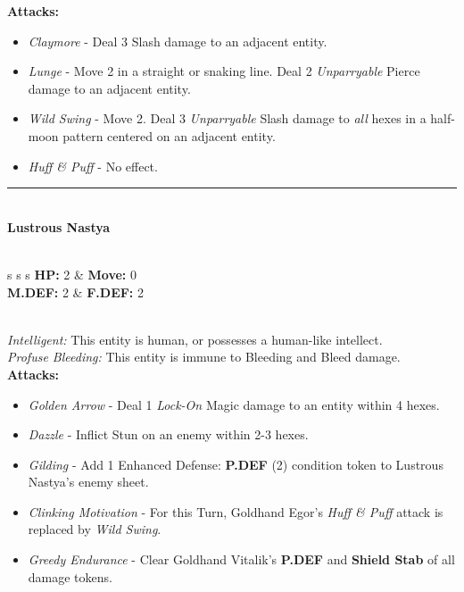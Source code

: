 \textbf{Attacks:}
\begin{itemize}
\item \emph{Claymore} -  Deal 3 Slash damage to an adjacent entity.
\item \emph{Lunge} - Move 2 in a straight or snaking line. Deal 2 \emph{Unparryable} Pierce damage to an adjacent entity.
\item \emph{Wild Swing} - Move 2. Deal 3 \emph{Unparryable} Slash damage to \emph{all} hexes in a half-moon pattern centered on an adjacent entity.
\item \emph{Huff \& Puff} - No effect.
\end{itemize}
\hrule
\ \\
{\large \textbf{Lustrous Nastya}}\\\\
\begin{tabular}{s s s}
\textbf{HP:} 2 & \textbf{Move:} 0\\
\textbf{M.DEF:} 2 & \textbf{F.DEF:} 2\\
\end{tabular}\\

\emph{Intelligent:} This entity is human, or possesses a human-like intellect.\\

\emph{Profuse Bleeding:} This entity is immune to Bleeding and Bleed damage.\\

\textbf{Attacks:}
\begin{itemize}
\item \emph{Golden Arrow} -  Deal 1 \emph{Lock-On} Magic damage to an entity within 4 hexes.
\item \emph{Dazzle} - Inflict Stun on an enemy within 2-3 hexes.
\item \emph{Gilding} - Add 1 Enhanced Defense: \textbf{P.DEF} (2) condition token to Lustrous Nastya’s enemy sheet.
\item \emph{Clinking Motivation} - For this Turn, Goldhand Egor’s \emph{Huff \& Puff} attack is replaced by \emph{Wild Swing}.
\item \emph{Greedy Endurance} - Clear Goldhand Vitalik’s \textbf{P.DEF} and \textbf{Shield Stab} of all damage tokens. 
\end{itemize}

\pagebreak

